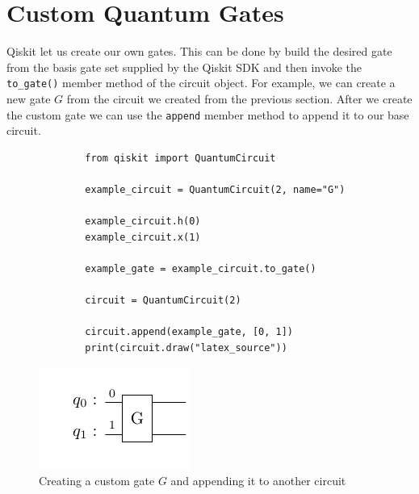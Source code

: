 \section{Custom Quantum Gates}

Qiskit let us create our own gates. This can be done by build the desired gate from the basis gate set supplied by the
Qiskit SDK and then invoke the \verb|to_gate()| member method of the circuit object. For example, we can create a new
gate $G$ from the circuit we created from the previous section. After we create the custom gate we can use the \verb|append|
member method to append it to our base circuit.

\begin{figure}[ht]
    \centering
    \begin{verbatim}
        from qiskit import QuantumCircuit
            
        example_circuit = QuantumCircuit(2, name="G")
            
        example_circuit.h(0)
        example_circuit.x(1)
            
        example_gate = example_circuit.to_gate()
            
        circuit = QuantumCircuit(2)
            
        circuit.append(example_gate, [0, 1])
        print(circuit.draw("latex_source"))
    \end{verbatim}
    \centering
    \includegraphics{images/4_Qiskit/example_custom_gate_1.pdf} 
    \caption{Creating a custom gate $G$ and appending it to another circuit}
\end{figure}